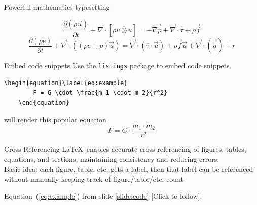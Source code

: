\documentclass{beamer}
\begin{document}
\begin{frame}{Powerful mathematics typesetting}
\begin{example}
\begin{equation}
\frac{\partial(\rho \overrightarrow{u})}{\partial t} + \overrightarrow{\nabla}\cdot[\rho\overline{\overline{u\otimes u}}] = -\overrightarrow{\nabla p} + \overrightarrow{\nabla}\cdot\overline{\overline{\tau}} + \rho\overrightarrow{f} \end{equation}
\begin{equation}
\frac{\partial(\rho e)}{\partial t} + \overrightarrow{\nabla}\cdot((\rho e + p)\overrightarrow{u}) = \overrightarrow{\nabla}\cdot(\overline{\overline{\tau}}\cdot\overrightarrow{u}) + \rho\overrightarrow{f}\overrightarrow{u} + \overrightarrow{\nabla}\cdot(\overrightarrow{\dot{q}})+r \end{equation}

\end{example}
\end{frame}

\begin{frame}[fragile]{Embed code snippets}\label{slide:code}
    Use the \lstinline|listings| package to embed code snippets.
    \begin{example}
      \begin{lstlisting}[mathescape]
    \begin{equation}\label{eq:example}
        F = G \cdot \frac{m_1 \cdot m_2}{r^2}
    \end{equation}
    \end{lstlisting} will render this popular equation \cite{einstein1905}
    \begin{equation}\label{eq:example}
        F = G \cdot \frac{m_1 \cdot m_2}{r^2}
    \end{equation}
    
    \end{example}
    
\end{frame}
\begin{frame}{Cross-Referencing}
    \LaTeX\ enables accurate cross-referencing of figures, tables, equations, and sections, maintaining consistency and reducing errors.\\ \vspace{0.2in}
    Basic idea: each figure, table, etc. gets a label, then that label can be referenced without manually keeping track of figure/table/etc. count\\
    \vspace{0.2in}
        
    \begin{example}
        Equation~(\ref{eq:example}) from slide \ref{slide:code} [Click to follow].
    \end{example}
\end{frame}
\end{document}
